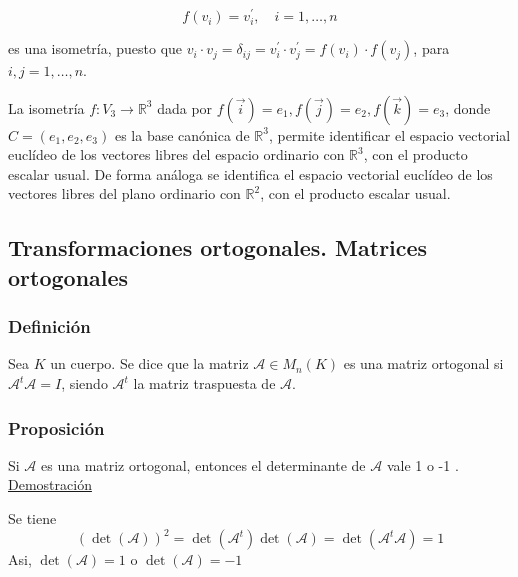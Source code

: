 \documentclass[12pt, a4paper, ones, notitlepage, openany,titlepage]{article}
\begin{document}
$$
f\left(v_{i}\right)=v_{i}^{\prime}, \quad i=1, \ldots, n
$$

es una isometría, puesto que $v_{i} \cdot v_{j}=\delta_{i j}=v_{i}^{\prime} \cdot v_{j}^{\prime}=f\left(v_{i}\right) \cdot f\left(v_{j}\right)$, para $i, j=1, \ldots, n$.

La isometría $f: V_{3} \rightarrow \mathbb{R}^{3}$ dada por $f(\vec{i})=e_{1}, f(\vec{j})=e_{2}, f(\vec{k})=e_{3}$, donde $C=\left(e_{1}, e_{2}, e_{3}\right)$ es la base canónica de $\mathbb{R}^{3}$, permite identificar el espacio vectorial euclídeo de los vectores libres del espacio ordinario con $\mathbb{R}^{3}$, con el producto escalar usual. De forma análoga se identifica el espacio vectorial euclídeo de los vectores libres del plano ordinario con $\mathbb{R}^{2}$, con el producto escalar usual.

\subsection{Transformaciones ortogonales. Matrices ortogonales}
\subsubsection{Definición}
Sea $K$ un cuerpo. Se dice que la matriz $\mathcal{A} \in M_{n}(K)$ es una matriz ortogonal si $\mathcal{A}^{t} \mathcal{A}=I$, siendo $\mathcal{A}^{t}$ la matriz traspuesta de $\mathcal{A}$.

\subsubsection{Proposición}
Si $\mathcal{A}$ es una matriz ortogonal, entonces el determinante de $\mathcal{A}$ vale 1 o -1 .\\

\noindent\underline{Demostración}

\noindent Se tiene
$$
(\operatorname{det}(\mathcal{A}))^{2}=\operatorname{det}\left(\mathcal{A}^{t}\right) \operatorname{det}(\mathcal{A})=\operatorname{det}\left(\mathcal{A}^{t} \mathcal{A}\right)=1
$$
Asi, $\operatorname{det}(\mathcal{A})=1$ o $\operatorname{det}(\mathcal{A})=-1$
\end{document}
